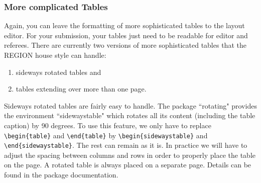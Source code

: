 \documentclass[a4paper,twoside]{article}
\begin{document}
\subsubsection{More complicated Tables}
\label{sec:4.2.2}

Again, you can leave the formatting of more sophisticated tables to the layout editor. For your submission, your tables just need to be readable for editor and referees. There are currently two versions of more sophisticated tables that the REGION house style can handle: 
\begin{enumerate}
  \item sideways rotated tables and
  \item tables extending over more than one page.
\end{enumerate} 

Sideways rotated tables are fairly easy to handle. The package ``rotating" provides the environment ``sidewaystable" which rotates all its content (including the table caption) by 90 degrees. To use this feature, we only have to replace \verb|\begin{table}| and \verb|\end{table}| by \verb|\begin{sidewaystable}| and \verb|\end{sidewaystable}|. The rest can remain as it is. In practice we will have to adjust the spacing between columns and rows in order to properly place the table on the page. A rotated table is always placed on a separate page. Details can be found in the package documentation.
\end{document}
